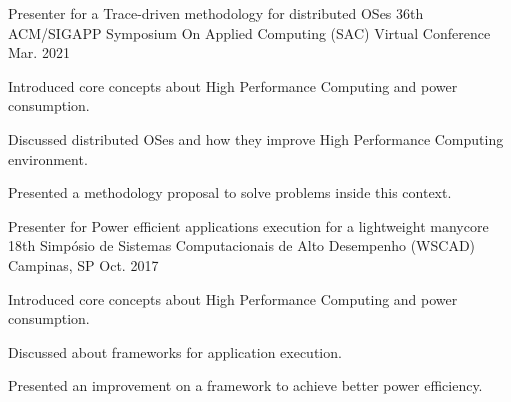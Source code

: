

\begin{cventries}


  \cventry
    {Presenter for a Trace-driven methodology for distributed OSes} %
    {36th ACM/SIGAPP Symposium On Applied Computing (SAC)} %
    {Virtual Conference} %
    {Mar. 2021} %
    {
      \begin{cvitems} %
        \item {Introduced core concepts about High Performance Computing and
            power consumption.}
        \item {Discussed distributed OSes and how they improve High Performance
            Computing environment.}
        \item {Presented a methodology proposal to solve problems inside this context.}
      \end{cvitems}
    }


  \cventry
    {Presenter for Power efficient applications execution for a lightweight manycore} %
    {18th Simpósio de Sistemas Computacionais de Alto Desempenho (WSCAD)} %
    {Campinas, SP} %
    {Oct. 2017} %
    {
      \begin{cvitems} %
        \item {Introduced core concepts about High Performance Computing and
            power consumption.}
        \item {Discussed about frameworks for application execution.}
        \item {Presented an improvement on a framework to achieve better power
          efficiency.}
      \end{cvitems}
    }



\end{cventries}
